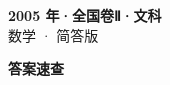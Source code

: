 \documentclass[zihao=-4, a4paper]{ctexart}
\begin{document}
\begin{center}
  {\Large\bfseries 2005 年·全国卷Ⅱ·文科}\\[4pt]
  {\large 数学 · 简答版}
\end{center}
\medskip
{}

\clearpage
{}
\begin{center}{\Large\bfseries 答案速查}\end{center}
\medskip

\end{document}
